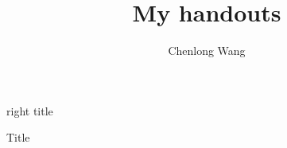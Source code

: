 \documentclass[12pt]{cwphandout}
\begin{document}
\author{Chenlong Wang}
\title{My handouts}{right title}
\begin{center}
{\fontsize{20}{20}\selectfont Title}	
\end{center}
\end{document}
